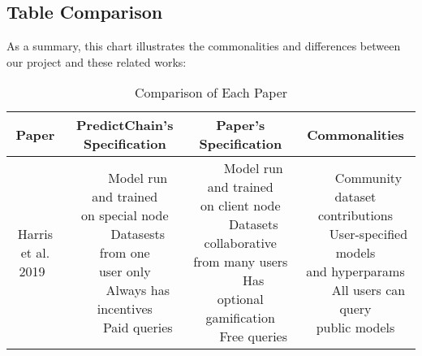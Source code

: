 \documentclass{article}
\newcommand{\tabitem}{~~\llap{\textbullet}~~}
\begin{document}
    \subsection{Table Comparison}

    As a summary, this chart illustrates the commonalities and differences between our project and these related works:

    \begin{table}[H]
        \begin{center}
            \caption{Comparison of Each Paper}
            \label{tab:relatedSummary}
            \bgroup
            \def\arraystretch{3}
            \begin{tabular}{c|c|c|c}
                \textbf{Paper} & \makecell{\textbf{PredictChain's}\\\textbf{Specification}} & \textbf{Paper's Specification} & \textbf{Commonalities}\\
                \hline
                \makecell{Harris et al.\\2019~\cite{sharingModels}} &
                \makecell[l]{
                    \tabitem Model run and trained\\on special node\\
                    \tabitem Datasests from one\\user only\\
                    \tabitem Always has incentives\\
                    \tabitem Paid queries\\
                } & \makecell[l]{
                    \tabitem Model run and trained\\on client node\\
                    \tabitem Datasets collaborative\\from many users\\
                    \tabitem Has optional\\gamification\\
                    \tabitem Free queries\\
                } & \makecell[l]{
                    \tabitem Community dataset\\contributions\\
                    \tabitem User-specified models\\and hyperparams\\
                    \tabitem All users can query\\public models\\
}
\end{tabular}
\end{center}
\end{table}
\end{document}
